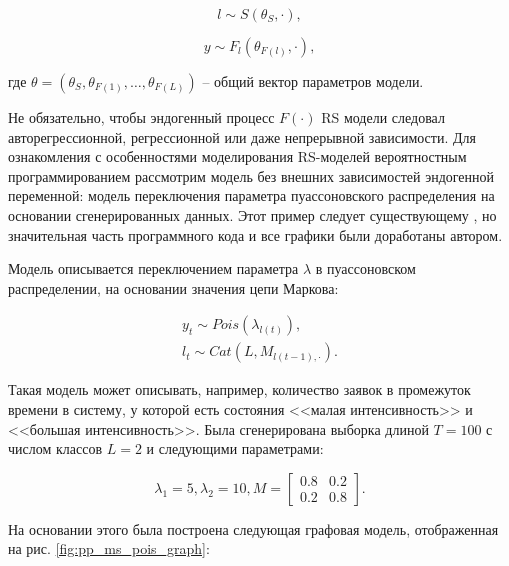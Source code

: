 \documentclass[a4paper,14pt]{extreport}
\begin{document}
\begin{equation}
	l \sim S(\theta_S, \cdot) ,
\end{equation}

\begin{equation}
	y \sim F_l(\theta_{F(l)},\cdot) ,
\end{equation}

\noindent
где $\theta = (\theta_S, \theta_{F(1)}, \dots, \theta_{F(L)}) $ -- общий вектор параметров модели. 

Не обязательно, чтобы эндогенный процесс $F(\cdot)$ RS модели следовал авторегрессионной, регрессионной или даже непрерывной зависимости. Для ознакомления с особенностями моделирования RS-моделей вероятностным программированием рассмотрим модель без внешних зависимостей эндогенной переменной: модель переключения параметра пуассоновского распределения на основании сгенерированных данных. Этот пример следует существующему \cite{blog_hidden_markov_ravinutala}, но значительная часть программного кода и все графики были доработаны автором.

Модель описывается переключением параметра $\lambda$ в пуассоновском распределении, на основании значения цепи Маркова:

\begin{equation}
	\begin{aligned}
		y_t \sim \mathit{Pois}(\lambda_{l(t)}) , \\
		l_t \sim \mathit{Cat}(L, M_{l(t-1), \cdot}) .
	\end{aligned}
	\label{eq:ms_pois_equation}
\end{equation}

Такая модель может описывать, например, количество заявок в промежуток времени в систему, у которой есть состояния <<малая интенсивность>> и <<большая интенсивность>>. Была сгенерирована выборка длиной $T=100$ с числом классов $L=2$ и следующими параметрами:

\begin{equation}
	\lambda_1 = 5, 
	\lambda_2 = 10,
	M = \left[ {\begin{array}{cc}
					0.8 & 0.2 \\
					0.2 & 0.8
				\end{array} } \right]
	\label{eq:ms_pois_coef_true}
	.
\end{equation}

На основании этого была построена следующая графовая модель, отображенная на рис. \ref{fig:pp_ms_pois_graph}:
\end{document}
